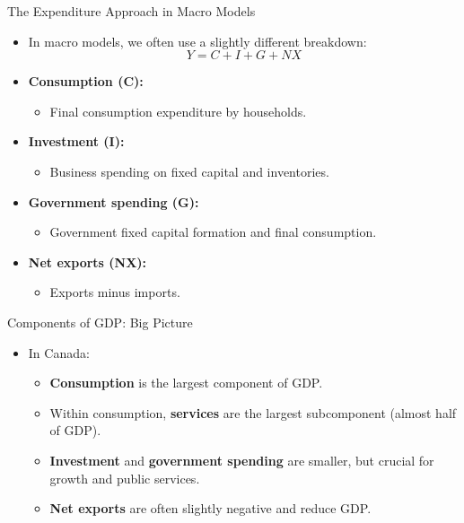 \documentclass[aspectratio=169]{beamer}
\begin{document}
\begin{frame}{The Expenditure Approach in Macro Models}
\transfade
\begin{itemize}[<+->]
  \item In macro models, we often use a slightly different breakdown:
  \[
    Y = C + I + G + NX
  \]
  \item \textbf{Consumption (C):}
  \begin{itemize}[<+->]
    \item Final consumption expenditure by households.
  \end{itemize}
  \item \textbf{Investment (I):}
  \begin{itemize}[<+->]
    \item Business spending on fixed capital and inventories.
  \end{itemize}
  \item \textbf{Government spending (G):}
  \begin{itemize}[<+->]
    \item Government fixed capital formation and final consumption.
  \end{itemize}
  \item \textbf{Net exports (NX):}
  \begin{itemize}[<+->]
    \item Exports minus imports.
  \end{itemize}
\end{itemize}
\end{frame}

\begin{frame}{Components of GDP: Big Picture}
\transfade
\begin{itemize}[<+->]
  \item In Canada:
  \begin{itemize}[<+->]
    \item \textbf{Consumption} is the largest component of GDP.
    \item Within consumption, \textbf{services} are the largest subcomponent (almost half of GDP).
    \item \textbf{Investment} and \textbf{government spending} are smaller, but crucial for growth and public services.
    \item \textbf{Net exports} are often slightly negative and reduce GDP.
  \end{itemize}
\end{itemize}
\end{frame}
\end{document}
